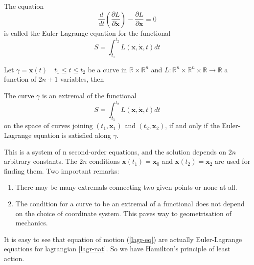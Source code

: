 \begin{definition}
        The equation
        \[\frac{d}{d t}(\frac{\partial L}{\partial \dot {\bm x}})-\frac{\partial L}{\partial  {\bm x}}=0 \]
        is called the Euler-Lagrange equation for the functional
        \[S=\int_{t_1}^{t_2} L(\bm x,\dot {\bm x},t) dt \]
\end{definition}
Let \( \gamma= \bm x(t) \quad t_1 \le t \le t_2 \) be a curve  in  $\mathbb{R} \times \mathbb{R}^n$ and 
$L: \mathbb{R}^n \times \mathbb{R}^n \times \mathbb{R}\rightarrow \mathbb{R}$ a function of $2 n +1$
variables, then
\begin{theorem}
    The curve $\gamma$ is an extremal of the functional \[S=\int_{t_1}^{t_2} L(\bm x,\dot {\bm x},t) dt \]
        on the space of curves joining $(t_1, \bm x_1)$ and $(t_2,\bm x_2)$, if and only if the Euler-
Lagrange equation is satisfied along $\gamma$.
\end{theorem}
This is a system of n second-order equations, and the solution depends on
$2 n$ arbitrary constants. The $2 n$ conditions $\bm x(t_1) = \bm x_0$ and $\bm x(t_2) = \bm x_2$ are used
for finding them.
Two important remarks:
\begin{enumerate}
        \item There may be many extremals connecting two
given points or none at all.
\item The condition for a curve  to be an extremal of a functional does not depend
on the choice of coordinate system. This paves way to geometrisation of mechanics.
\end{enumerate}

It is easy to see that equation of motion (\ref{lagr-eq}) are actually
Euler-Lagrange equations for lagrangian \eqref{lagr-nat}. So we have  Hamilton's
principle of least action.

